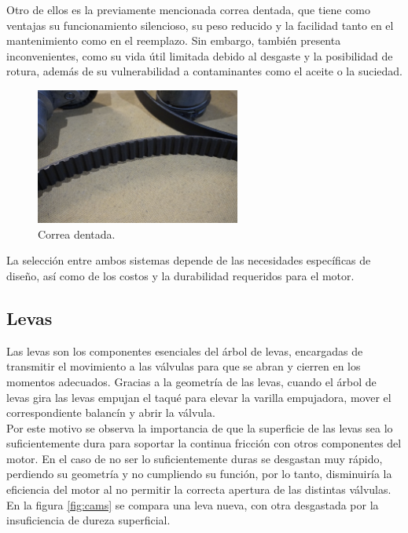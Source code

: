Otro de ellos es la previamente mencionada correa dentada, que tiene como ventajas su funcionamiento silencioso, su peso reducido y la facilidad tanto en el mantenimiento como en el reemplazo. Sin embargo, también presenta inconvenientes, como su vida útil limitada debido al desgaste y la posibilidad de rotura, además de su vulnerabilidad a contaminantes como el aceite o la suciedad.

\begin{figure}[H]
	\centering
	\includegraphics[width=0.6\textwidth]{Figures/01/m2/correa.jpg}
	\caption{Correa dentada.}
	\label{fig:dist_belt}
\end{figure}

La selección entre ambos sistemas depende de las necesidades específicas de diseño, así como de los costos y la durabilidad requeridos para el motor.

\subsection{Levas} \label{ss:cams}

Las levas son los componentes esenciales del árbol de levas, encargadas de transmitir el movimiento a las válvulas para que se abran y cierren en los momentos adecuados. Gracias a la geometría de las levas, cuando el árbol de levas gira las levas empujan el taqué para elevar la varilla empujadora, mover el correspondiente balancín y abrir la válvula.\\

Por este motivo se observa la importancia de que la superficie de las levas sea lo suficientemente dura para soportar la continua fricción con otros componentes del motor. En el caso de no ser lo suficientemente duras se desgastan muy rápido, perdiendo su geometría y no cumpliendo su función, por lo tanto, disminuiría la eficiencia del motor al no permitir la correcta apertura de las distintas válvulas. En la figura \ref{fig:cams} se compara una leva nueva, con otra desgastada por la insuficiencia de dureza superficial.

